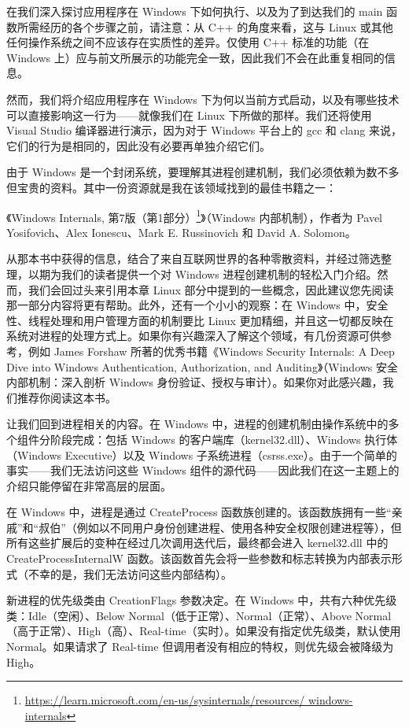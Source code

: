 
在我们深入探讨应用程序在 Windows 下如何执行、以及为了到达我们的 main 函数所需经历的各个步骤之前，请注意：从 C++ 的角度来看，这与 Linux 或其他任何操作系统之间不应该存在实质性的差异。仅使用 C++ 标准的功能（在 Windows 上）应与前文所展示的功能完全一致，因此我们不会在此重复相同的信息。

然而，我们将介绍应用程序在 Windows 下为何以当前方式启动，以及有哪些技术可以直接影响这一行为——就像我们在 Linux 下所做的那样。我们还将使用 Visual Studio 编译器进行演示，因为对于 Windows 平台上的 gcc 和 clang 来说，它们的行为是相同的，因此没有必要再单独介绍它们。

由于 Windows 是一个封闭系统，要理解其进程创建机制，我们必须依赖为数不多但宝贵的资料。其中一份资源就是我在该领域找到的最佳书籍之一：

《Windows Internals, 第7版（第1部分）\footnote{\url{https://learn.microsoft.com/en-us/sysinternals/resources/
windows-internals}}》（Windows 内部机制），作者为 Pavel Yosifovich、Alex Ionescu、Mark E. Russinovich 和 David A. Solomon。

从那本书中获得的信息，结合了来自互联网世界的各种零散资料，并经过筛选整理，以期为我们的读者提供一个对 Windows 进程创建机制的轻松入门介绍。然而，我们会回过头来引用本章 Linux 部分中提到的一些概念，因此建议您先阅读那一部分内容将更有帮助。此外，还有一个小小的观察：在 Windows 中，安全性、线程处理和用户管理方面的机制要比 Linux 更加精细，并且这一切都反映在系统对进程的处理方式上。如果你有兴趣深入了解这个领域，有几份资源可供参考，例如 James Forshaw 所著的优秀书籍《Windows Security Internals: A Deep Dive into Windows Authentication, Authorization, and Auditing》（Windows 安全内部机制：深入剖析 Windows 身份验证、授权与审计）。如果你对此感兴趣，我们推荐你阅读这本书。

让我们回到进程相关的内容。在 Windows 中，进程的创建机制由操作系统中的多个组件分阶段完成：包括 Windows 的客户端库（kernel32.dll）、Windows 执行体（Windows Executive）以及 Windows 子系统进程（csrss.exe）。由于一个简单的事实——我们无法访问这些 Windows 组件的源代码——因此我们在这一主题上的介绍只能停留在非常高层的层面。

在 Windows 中，进程是通过 CreateProcess 函数族创建的。该函数族拥有一些“亲戚”和“叔伯”（例如以不同用户身份创建进程、使用各种安全权限创建进程等），但所有这些扩展后的变种在经过几次调用迭代后，最终都会进入 kernel32.dll 中的 CreateProcessInternalW 函数。该函数首先会将一些参数和标志转换为内部表示形式（不幸的是，我们无法访问这些内部结构）。

新进程的优先级类由 CreationFlags 参数决定。在 Windows 中，共有六种优先级类：Idle（空闲）、Below Normal（低于正常）、Normal（正常）、Above Normal（高于正常）、High（高）、Real-time（实时）。如果没有指定优先级类，默认使用 Normal。如果请求了 Real-time 但调用者没有相应的特权，则优先级会被降级为 High。

